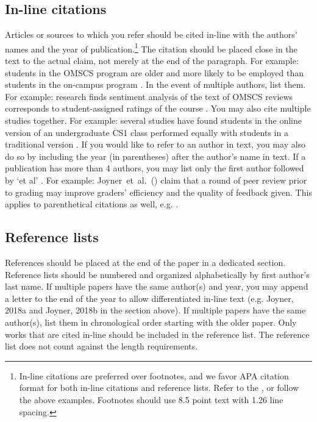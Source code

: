 \subsection{In-line citations}
Articles or sources to which you refer should be cited in-line with the
authors' names and the year of publication.\footnote{In-line citations are preferred over footnotes, and we favor APA citation format for both in-line citations and reference lists. Refer to the , or follow the above examples. Footnotes should use 8.5 point text with 1.26 line spacing.
} The citation should be placed close
in the text to the actual claim, not merely at the end of the paragraph. For
example: students in the OMSCS program are older and more likely to be employed
than students in the on-campus program \citep{Joyner17}. In the event of
multiple authors, list them. For example: research finds sentiment analysis of
the text of OMSCS reviews corresponds to student-assigned ratings of the course
\citep{Newman18}. You may also cite multiple studies together. For example:
several studies have found students in the online version of an undergraduate
CS1 class performed equally with students in a traditional version
\citep{Joyner18a,Joyner18b,Joyner19}. If you would like to refer to an author in
text, you may also do so by including the year (in parentheses) after the
author's name in text. If a publication has more than 4 authors, you may list
only the first author followed by `et al' . For example:
Joyner~et~al.~(\citeyear{Joyner16}) claim that a round of peer review prior to
grading may improve graders' efficiency and the quality of feedback given. This
applies to parenthetical citations as well, e.g. \citep{Joyner16}.

\subsection{Reference lists}
References should be placed at the end of the paper in a dedicated section. Reference lists should be numbered and organized alphabetically by first author’s last name. If multiple papers have the same author(s) and year, you may append a letter to the end of the year to allow differentiated in-line text (e.g. Joyner, 2018a and Joyner, 2018b in the section above). If multiple papers have the same author(s), list them in chronological order starting with the older paper. Only works that are cited in-line should be included in the reference list. The reference list does not count against the length requirements.

